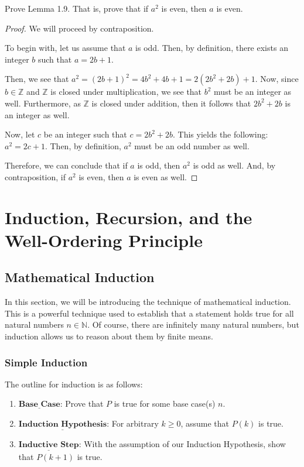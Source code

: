 \documentclass[openany]{book}
\renewcommand\qedsymbol{$\blacksquare$}
\begin{document}
\begin{hw}
	Prove Lemma 1.9. That is, prove that if $a^{2}$ is even, then $a$ is even.
\end{hw}
\begin{proof}\renewcommand{\qedsymbol}{$\blacksquare$}
	We will proceed by contraposition.
	
	To begin with, let us assume that $a$ is odd. Then, by definition, there exists an integer $b$ such that $a=2b+1$.
	
	Then, we see that $a^2 = (2b+1)^2 = 4b^2 + 4b + 1 = 2(2b^2 + 2b) + 1$. Now, since $b\in\mathbb{Z}$ and $\mathbb{Z}$ is closed under multiplication, we see that $b^2$ must be an integer as well. Furthermore, as $\mathbb{Z}$ is closed under addition, then it follows that $2b^2 + 2b$ is an integer as well.
	
	Now, let $c$ be an integer such that $c=2b^2 + 2b$. This yields the following: $a^2=2c+1$. Then, by definition, $a^2$ must be an odd number as well.
	
	Therefore, we can conclude that if $a$ is odd, then $a^2$ is odd as well. And, by contraposition, if $a^2$ is even, then $a$ is even as well.
\end{proof}

\newpage

\chapter{Induction, Recursion, and the Well-Ordering Principle}
\section{Mathematical Induction}
In this section, we will be introducing the technique of mathematical induction. This is a powerful technique used to establish that a statement holds true for all natural numbers $n\in\mathbb{N}$. Of course, there are infinitely many natural numbers, but induction allows us to reason about them by finite means.
\subsection{Simple Induction} 
The outline for induction is as follows:
\begin{enumerate}
	\item $\underline{\textbf{Base Case}}$: Prove that $P$ is true for some base case(s) $n$.
	\item $\underline{\textbf{Induction Hypothesis}}$: For arbitrary $k\geq 0$, assume that $P(k)$ is true.
	\item $\underline{\textbf{Inductive Step}}$: With the assumption of our Induction Hypothesis, show that $P(k+1)$ is true.
\end{enumerate}
\end{document}
